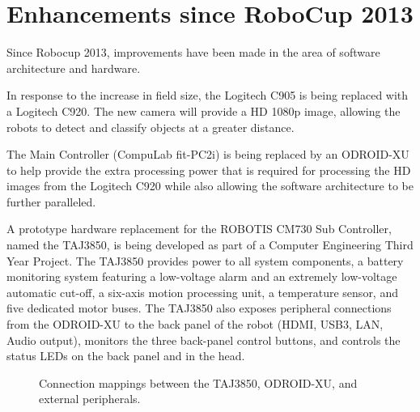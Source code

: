 \documentclass{llncs}
\begin{document}
\section{Enhancements since RoboCup 2013}
Since Robocup 2013, improvements have been made in the area of software architecture and hardware. 

In response to the increase in field size, the Logitech C905 is being replaced with a Logitech C920. The new camera will provide a HD 1080p image, allowing the robots to detect and classify objects at a greater distance.

The Main Controller (CompuLab fit-PC2i) is being replaced by an ODROID-XU to help provide the extra processing power that is required for processing the HD images from the Logitech C920 while also allowing the software architecture to be further paralleled.

A prototype hardware replacement for the ROBOTIS CM730 Sub Controller, named the TAJ3850, is 
being developed as part of a Computer Engineering Third Year Project. The TAJ3850 provides power to all system components, a battery monitoring system featuring a low-voltage alarm and an extremely low-voltage automatic cut-off, a six-axis motion processing unit, a temperature sensor, and five dedicated motor buses. The TAJ3850 also exposes peripheral connections from the ODROID-XU to the back panel of the robot (HDMI, USB3, LAN, Audio output), monitors the three back-panel control buttons, and controls the status LEDs on the back panel and in the head.

\begin{figure}
\begin{center}
\caption{Connection mappings between the TAJ3850, ODROID-XU, and external peripherals.}
\label{fig:taj3850}
\end{center}
\end{figure}
\end{document}
